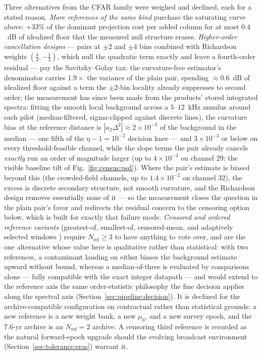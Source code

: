 \begin{enumerate}
    Three alternatives from the CFAR family were weighed and declined, each for a stated reason. \emph{More references of the same kind} purchase the saturating curve above: $+33\%$ of the dominant projection cost per added column for at most $0.4$~dB of idealized floor that the measured null structure erases. \emph{Higher-order cancellation designs} --- pairs at $\pm 2$ and $\pm 4$ bins combined with Richardson weights $(\tfrac{4}{3}, -\tfrac{1}{3})$, which null the quadratic term exactly and leave a fourth-order residual --- pay the Savitzky--Golay tax: the curvature-free estimator's denominator carries $1.9\times$ the variance of the plain pair, spending ${\approx}0.6$~dB of idealized floor against a term the $\pm 2$-bin locality already suppresses to second order; the measurement has since been made from the products' stored integrated spectra: fitting the smooth local background across a $5$--$12$~kHz annulus around each pilot (median-filtered, sigma-clipped against discrete lines), the curvature bias at the reference distance is $|a_2 \Delta^2| \approx 2\times 10^{-3}$ of the background in the median --- one fifth of the $\eta - 1 = 10^{-2}$ decision knee --- and $3\times 10^{-3}$ or below on every threshold-feasible channel, while the slope terms the pair already cancels \emph{exactly} run an order of magnitude larger (up to $4\times 10^{-2}$ on channel 29: the visible baseline tilt of Fig.~\ref{fig:census:psd}). Where the pair's estimate is biased beyond this (the crowded-field channels, up to $1.4\times 10^{-2}$ on channel 32), the excess is discrete secondary structure, not smooth curvature, and the Richardson design removes essentially none of it --- so the measurement closes the question in the plain pair's favor and redirects the residual concern to the censoring option below, which is built for exactly that failure mode. \emph{Censored and ordered reference variants} (greatest-of, smallest-of, censored-mean, and adaptively selected windows \cite{gandhi1988,smith2000}) require $N_{\text{ref}} \ge 3$ to have anything to vote over, and are the one alternative whose value here is qualitative rather than statistical: with two references, a contaminant landing on either biases the background estimate upward without bound, whereas a median-of-three is evaluated by comparisons alone --- fully compatible with the exact integer datapath --- and would extend to the reference axis the same order-statistic philosophy the fine decision applies along the spectral axis (Section~\ref{sec:pipeline:decision}). It is declined for the archive-compatible configuration on contractual rather than statistical grounds: a new reference is a new weight bank, a new $\mu_0$, and a new survey epoch, and the 7.6-yr archive is an $N_{\text{ref}} = 2$ archive. A censoring third reference is recorded as the natural forward-epoch upgrade should the evolving broadcast environment (Section~\ref{sec:tolerance:eras}) warrant it.


\end{enumerate}
